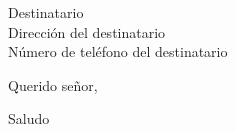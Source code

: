 \documentclass[a4paper,11pt]{letter}
\begin{document}
\begin{letter}{Destinatario\\Dirección del destinatario\\Número de teléfono del destinatario}
	
\opening{Querido señor,}


\closing{Saludo}


\end{letter}
\end{document}
